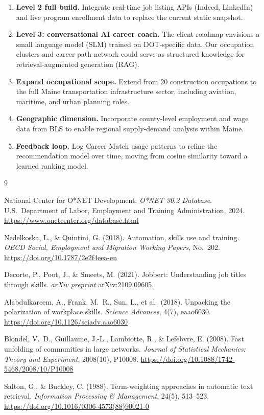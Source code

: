 \documentclass[12pt]{article}
\begin{document}
\begin{enumerate}
    \item \textbf{Level 2 full build.} Integrate real-time job
    listing APIs (Indeed, LinkedIn) and live program enrollment
    data to replace the current static snapshot.

    \item \textbf{Level 3: conversational AI career coach.} The
    client roadmap envisions a small language model (SLM) trained
    on DOT-specific data. Our occupation clusters and career path
    network could serve as structured knowledge for
    retrieval-augmented generation (RAG).

    \item \textbf{Expand occupational scope.} Extend from 20
    construction occupations to the full Maine transportation
    infrastructure sector, including aviation, maritime, and
    urban planning roles.

    \item \textbf{Geographic dimension.} Incorporate county-level
    employment and wage data from BLS to enable regional
    supply-demand analysis within Maine.

    \item \textbf{Feedback loop.} Log Career Match usage patterns
    to refine the recommendation model over time, moving from
    cosine similarity toward a learned ranking model.
\end{enumerate}

\begin{thebibliography}{9}

National Center for O*NET Development.
\textit{O*NET 30.2 Database}.
U.S.\ Department of Labor, Employment and Training
Administration, 2024.
\url{https://www.onetcenter.org/database.html}

Nedelkoska, L., \& Quintini, G. (2018).
Automation, skills use and training.
\textit{OECD Social, Employment and Migration Working Papers},
No.\ 202.
\url{https://doi.org/10.1787/2e2f4eea-en}

Decorte, P., Poot, J., \& Smeets, M. (2021).
Jobbert: Understanding job titles through skills.
\textit{arXiv preprint} arXiv:2109.09605.

Alabdulkareem, A., Frank, M.\ R., Sun, L., et al.\ (2018).
Unpacking the polarization of workplace skills.
\textit{Science Advances}, 4(7), eaao6030.
\url{https://doi.org/10.1126/sciadv.aao6030}

Blondel, V.\ D., Guillaume, J.-L., Lambiotte, R., \&
Lefebvre, E. (2008).
Fast unfolding of communities in large networks.
\textit{Journal of Statistical Mechanics: Theory and Experiment},
2008(10), P10008.
\url{https://doi.org/10.1088/1742-5468/2008/10/P10008}

Salton, G., \& Buckley, C. (1988).
Term-weighting approaches in automatic text retrieval.
\textit{Information Processing \& Management}, 24(5), 513--523.
\url{https://doi.org/10.1016/0306-4573(88)90021-0}

\end{thebibliography}
\end{document}
